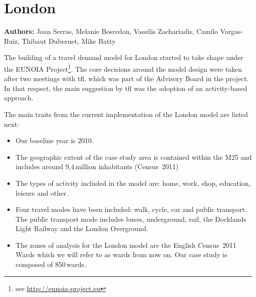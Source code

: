 \chapter{London}
\label{ch:london}
\hfill \textbf{Authors:} Joan Serras, Melanie Bosredon, Vassilis Zachariadis, Camilo Vargas-Ruiz, Thibaut Dubernet, Mike Batty

The building of a travel demand model for London started to take shape under the EUNOIA Project\footnote{see \url{http://eunoia-project.eu}}. 
The core decisions around the model design were taken after two meetings with \gls{tfl}, which was part of the Advisory Board in the project. 
In that respect, the main suggestion by \gls{tfl} was the adoption of an activity-based approach.

The main traits from the current implementation of the London model are listed next:
%
\begin{itemize}\styleItemize
\item Our baseline year is 2010.
\item	The geographic extent of the case study area is contained within the M25 and includes around 9,4\,million inhabitants (Census~2011)
\item	The types of activity included in the model are: home, work, shop, education, leisure and other.
\item	Four travel modes have been included: walk, cycle, car and public transport. The public transport mode includes buses, underground, rail, the Docklands Light Railway and the London Overground.
\item	The zones of analysis for the London model are the English Census~2011 Wards which we will refer to as wards from now on. Our case study is composed of 850\,wards.
\end{itemize}
%
